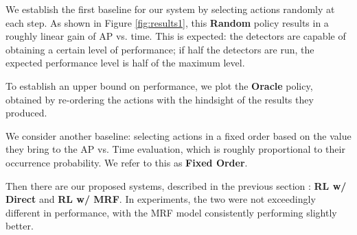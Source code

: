 \begin{figure}[h!]
\centering
{} \hfill
{}
\caption{}
\end{figure}

We establish the first baseline for our system by selecting actions randomly at each step.
As shown in Figure \autoref{fig:results1}, this \textbf{Random} policy results in a roughly linear gain of AP vs. time.
This is expected: the detectors are capable of obtaining a certain level of performance; if half the detectors are run, the expected performance level is half of the maximum level.

To establish an upper bound on performance, we plot the \textbf{Oracle} policy, obtained by re-ordering the actions with the hindsight of the results they produced.

We consider another baseline: selecting actions in a fixed order based on the value they bring to the AP vs. Time evaluation, which is roughly proportional to their occurrence probability.
We refer to this as \textbf{Fixed Order}.

Then there are our proposed systems, described in the previous section : \textbf{RL w/ Direct} and \textbf{RL w/ MRF}.
In experiments, the two were not exceedingly different in performance, with the MRF model consistently performing slightly better.

